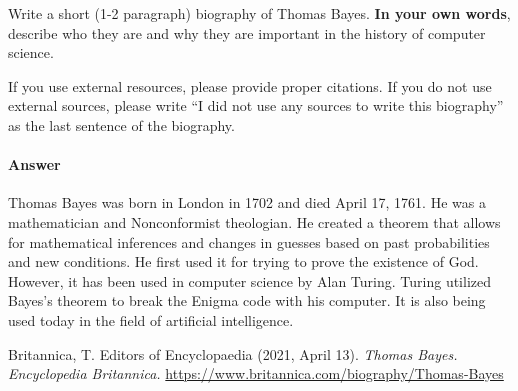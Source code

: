 \documentclass{article}
\begin{document}

Write a short (1-2 paragraph) biography of Thomas Bayes.
\textbf{In your own words}, describe who they are and why they are important in
the history of computer science.

If you use external resources, please provide
proper citations. If you do not use external sources, please write ``I did not
use any sources to write this biography'' as the last sentence of the
biography.

\paragraph{Answer}

Thomas Bayes was born in London in 1702 and died April 17, 1761. He was a mathematician and Nonconformist theologian.
He created a theorem that allows for mathematical inferences and changes in guesses based on past probabilities and new conditions. He first used it for trying to prove the existence of God. However, it has been used in computer science by Alan Turing. Turing utilized Bayes's theorem to break the Enigma code with his computer. It is also being used today in the field of artificial intelligence.

Britannica, T. Editors of Encyclopaedia (2021, April 13). \textit{Thomas Bayes. Encyclopedia Britannica.} \url{https://www.britannica.com/biography/Thomas-Bayes}

% 
% 
\end{document}
